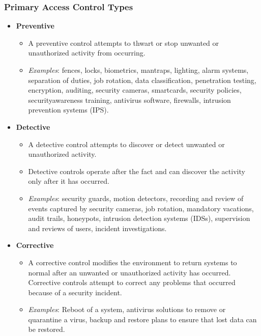 \subsubsection{Primary Access Control Types}
\begin{itemize}
    \item \textbf{Preventive}
    \begin{itemize}
        \item A preventive control attempts to thwart or stop unwanted or unauthorized activity from occurring.
        \item \textit{Examples}: fences, locks, biometrics, mantraps, lighting, alarm systems, separation of duties, job rotation, data classification, penetration testing, encryption, auditing, security cameras, smartcards, security policies, securityawareness training, antivirus software, firewalls, intrusion prevention systems (IPS).
    \end{itemize}
    \item \textbf{Detective}
    \begin{itemize}
        \item  A detective control attempts to discover or detect unwanted or unauthorized activity.
        \item Detective controls operate after the fact and can discover the activity only after it has occurred.
        \item \textit{Examples}: security guards, motion detectors, recording and review of events captured by security cameras, job rotation, mandatory vacations, audit trails, honeypots, intrusion detection systems (IDSs), supervision and reviews of users, incident investigations.
    \end{itemize}
    \item \textbf{Corrective}
    \begin{itemize}
        \item A corrective control modifies the environment to return systems to normal after an unwanted or unauthorized activity has occurred. Corrective controls attempt to correct any problems that occurred because of a security incident.
        \item \textit{Examples}: Reboot of a system, antivirus solutions to remove or quarantine a virus, backup and restore plans to ensure that lost data can be restored.
    \end{itemize}
\end{itemize}

